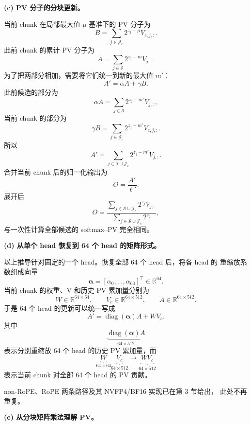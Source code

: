 \documentclass[UTF8,fontset=fandol,a4paper,10pt]{ctexart}
\newcommand{\diag}{\operatorname{diag}}
\begin{document}
\textbf{(c) PV 分子的分块更新。}

当前 chunk 在局部最大值 $\mu$ 基准下的 PV 分子为
\[
  B
  =
  \sum_{j\in\mathcal J_c}
  2^{z_j-\mu}V_{c,j,:}.
\]
此前 chunk 的累计 PV 分子为
\[
  A
  =
  \sum_{j\in\mathcal S}
  2^{z_j-m}V_{j,:}.
\]
为了把两部分相加，需要将它们统一到新的最大值 $m'$：
\[
  \boxed{
    A'=\alpha A+\gamma B
  }.
\]
此前候选的部分为
\[
  \alpha A
  =
  \sum_{j\in\mathcal S}
  2^{z_j-m'}V_{j,:},
\]
当前 chunk 的部分为
\[
  \gamma B
  =
  \sum_{j\in\mathcal J_c}
  2^{z_j-m'}V_{c,j,:}.
\]
所以
\[
  A'
  =
  \sum_{j\in\mathcal S\cup\mathcal J_c}
  2^{z_j-m'}V_{j,:}.
\]
合并当前 chunk 后的归一化输出为
\[
  \boxed{
    O=\frac{A'}{\ell'}
  }.
\]
展开后
\[
  O
  =
  \frac{
    \sum_{j\in\mathcal S\cup\mathcal J_c}
    2^{z_j}V_{j,:}
  }{
    \sum_{j\in\mathcal S\cup\mathcal J_c}
    2^{z_j}
  },
\]
与一次性计算全部候选的 softmax--PV 完全相同。

\textbf{(d) 从单个 head 恢复到 64 个 head 的矩阵形式。}

以上推导针对固定的一个 head。恢复全部 64 个 head 后，将各 head 的
重缩放系数组成向量
\[
  \boldsymbol{\alpha}
  =
  [\alpha_0,\ldots,\alpha_{63}]^\top
  \in\mathbb R^{64}.
\]
当前 chunk 的权重、V 和历史 PV 累加量分别为
\[
  W\in\mathbb R^{64\times64},\qquad
  V_c\in\mathbb R^{64\times512},\qquad
  A\in\mathbb R^{64\times512}.
\]
于是 64 个 head 的更新可以统一写成
\[
  \boxed{
    A'
    =
    \diag(\boldsymbol{\alpha})A+WV_c
  }.
\]
其中
\[
  \underbrace{\diag(\boldsymbol{\alpha})A}_{64\times512}
\]
表示分别重缩放 64 个 head 的历史 PV 累加量，而
\[
  \underbrace{W}_{64\times64}
  \underbrace{V_c}_{64\times512}
  \longrightarrow
  \underbrace{WV_c}_{64\times512}
\]
表示当前 chunk 对全部 64 个 head 的 PV 贡献。

non-RoPE、RoPE 两条路径及其 NVFP4/BF16 实现已在第 3 节给出，
此处不再重复。

\textbf{(e) 从分块矩阵乘法理解 PV。}
\end{document}
